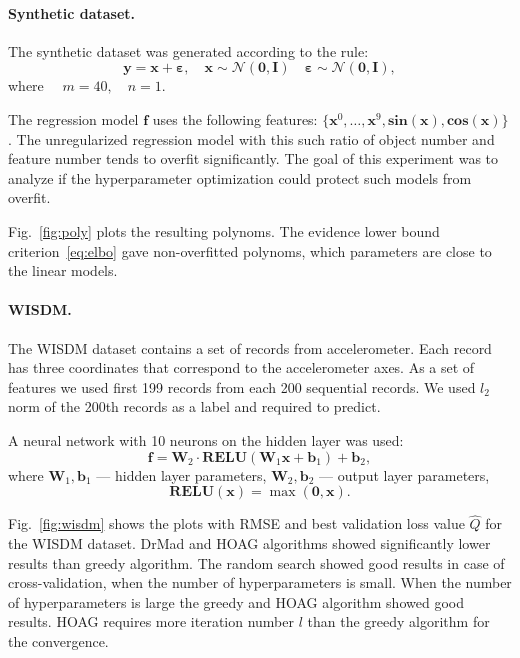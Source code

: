\documentclass[smallcondensed]{svjour3}
\begin{document}
\paragraph{Synthetic dataset.}
The synthetic dataset was generated according to the rule:
\[
	\mathbf{y} = \mathbf{x} + \boldsymbol{\varepsilon},\quad \mathbf{x}  \sim \mathcal{N}(\mathbf{0}, \mathbf{I}) \quad \boldsymbol{\varepsilon} \sim \mathcal{N}(\mathbf{0}, \mathbf{I}),
\]
where $\quad m = 40, \quad n = 1.$

The regression model $\mathbf{f}$ uses the following features: $\{\mathbf{x}^0, \dots, \mathbf{x}^9, \textbf{sin}(\mathbf{x}), \textbf{cos}(\mathbf{x})\}$. The unregularized regression model with this such ratio of  object number and feature number tends to overfit significantly. The goal of this experiment was to analyze if the hyperparameter optimization could protect such models from overfit.

Fig.~\ref{fig:poly} plots the resulting polynoms. 
The evidence lower bound criterion~\eqref{eq:elbo} gave non-overfitted polynoms, which parameters are close to the linear models.

\paragraph{WISDM.}
The WISDM dataset contains a set of records from accelerometer. Each record has three coordinates that correspond to the accelerometer axes. As a set of features we used first 199  records from each 200 sequential records. We used $l_2$ norm of the 200th records as a label and required to predict. 

A neural network with 10 neurons on the hidden layer was used:
\[
    \mathbf{f} = \mathbf{W}_2 \cdot \textbf{RELU}(\mathbf{W}_1\mathbf{x} + \mathbf{b}_1) +\mathbf{b}_2,
\]
where $\mathbf{W}_1, \mathbf{b}_1$ --- hidden layer parameters,
$\mathbf{W}_2, \mathbf{b}_2$ --- output layer parameters,
\[
    \textbf{RELU}(\mathbf{x}) = \max(\mathbf{0}, \mathbf{x}).
\]

Fig.~\ref{fig:wisdm} shows the plots with RMSE and best validation loss value $\hat{Q}$ for the WISDM dataset.
DrMad and HOAG algorithms showed significantly lower results than greedy algorithm. The random search showed good results in case of cross-validation, when the number of hyperparameters is small. When the number of hyperparameters is large the greedy and HOAG algorithm showed good results. HOAG requires more iteration number $l$ than the greedy algorithm for the convergence.
\end{document}
